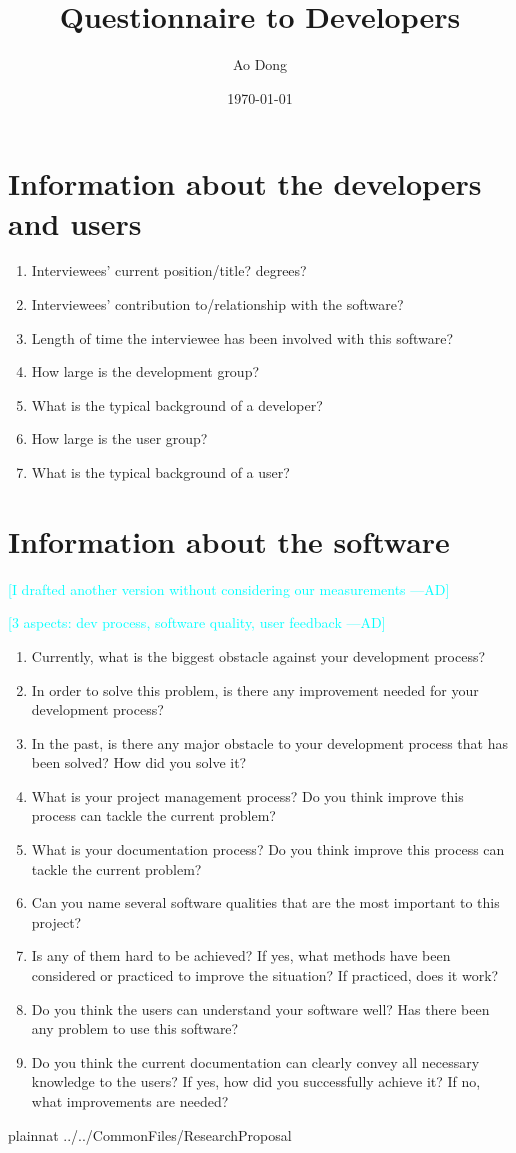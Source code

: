 \documentclass[12pt]{article}
\title{Questionnaire to Developers}
\author{Ao Dong}
\date{\today}
\newcommand{\authornote}[3]{\textcolor{#1}{[#3 ---#2]}}
\newcommand{\authornote}[3]{}
\newcommand{\ad}[1]{\authornote{cyan}{AD}{#1}} %
\begin{document}
\maketitle

\section{Information about the developers and users}\citep{Jegatheesan2016}
\begin{enumerate}
\item Interviewees' current position/title? degrees?
\item Interviewees' contribution to/relationship with the software?
\item Length of time the interviewee has been involved with this software?
\item How large is the development group?
\item What is the typical background of a developer?
\item How large is the user group?
\item What is the typical background of a user?
\end{enumerate}

\section{Information about the software}

\ad{I drafted another version without considering our measurements}

\noindent\ad{3 aspects: dev process, software quality, user feedback}

\begin{enumerate}
\item Currently, what is the biggest obstacle against your development process?
\item In order to solve this problem, is there any improvement needed for your
development process?
\item In the past, is there any major obstacle to your development process that
has been solved? How did you solve it?
\item What is your project management process? Do you think improve this process
can tackle the current problem?
\item What is your documentation process? Do you think improve this process can
tackle the current problem?
\item Can you name several software qualities that are the most important to
this project?
\item Is any of them hard to be achieved? If yes, what methods have been considered
or practiced to improve the situation? If practiced, does it work?
\item Do you think the users can understand your software well? Has there been
any problem to use this software?
\item Do you think the current documentation can clearly convey all necessary
knowledge to the users? If yes, how did you successfully achieve it? If no, what
improvements are needed?
\end{enumerate}

\newpage

 {plainnat}
 {../../CommonFiles/ResearchProposal}
\end{document}
